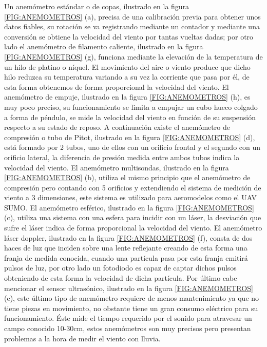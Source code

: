 Un anemómetro estándar o de copas\cite{cupAnemo}, ilustrado en la figura \ref{FIG:ANEMOMETROS} (a), precisa de una calibración previa para obtener unos datos fiables, su rotación se va registrando mediante un contador y mediante una conversión se obtiene la velocidad del viento por tantas vueltas dadas; por otro lado el anemómetro de filamento caliente\cite{hotWireInfoWeb}\cite{hotWireAnem}, ilustrado en la figura \ref{FIG:ANEMOMETROS} (g), funciona mediante la elevación de la temperatura de un hilo de platino o níquel. El movimiento del aire o viento produce que dicho hilo reduzca su temperatura variando a su vez la corriente que pasa por él, de esta forma obtenemos de forma proporcional la velocidad del viento. El anemómetro de empuje\cite{emujeAnem}, ilustrado en la figura \ref{FIG:ANEMOMETROS} (h), es muy poco preciso, su funcionamiento se limita a empujar un cubo hueco colgado a forma de péndulo, se mide la velocidad del viento en función de su suspensión respecto a su estado de reposo. A continuación existe el anemómetro de compresión o tubo de Pitot\cite{Extech}\cite{emujeAnem}, ilustrado en la figura \ref{FIG:ANEMOMETROS} (d), está formado por 2 tubos, uno de ellos con un orificio frontal y el segundo con un orificio lateral, la diferencia de presión medida entre ambos tubos indica la velocidad del viento. El anemómetro multisondas\cite{NASA}\cite{Anemometer2009}, ilustrado en la figura \ref{FIG:ANEMOMETROS} (b), utiliza el mismo principio que el anemómetro de compresión pero contando con 5 orificios y extendiendo el sistema de medición de viento a 3 dimensiones, este sistema es utilizado para aeromodelos como el UAV SUMO. El anemómetro esférico\cite{Holling2007}, ilustrado en la figura \ref{FIG:ANEMOMETROS} (c), utiliza una sistema con una esfera para incidir con un láser, la desviación que sufre el láser indica de forma proporcional la velocidad del viento. El anemómetro láser doppler\cite{Tropea1995}\cite{lasercantilver}\cite{durst1980principles}\cite{albrecht2013laser}, ilustrado en la figura \ref{FIG:ANEMOMETROS} (f), consta de dos haces de luz que inciden sobre una lente reflejante creando de esta forma una franja de medida conocida, cuando una partícula pasa por esta franja emitirá pulsos de luz, por otro lado un fotodiodo es capaz de captar dichos pulsos obteniendo de esta forma la velocidad de dicha partícula. Por último cabe mencionar el sensor ultrasónico\cite{Prudden2016}\cite{Mur2012}, ilustrado en la figura \ref{FIG:ANEMOMETROS} (e), este último tipo de anemómetro requiere de menos mantenimiento ya que no tiene piezas en movimiento, no obstante tiene un gran consumo eléctrico para su funcionamiento. Éste mide el tiempo requerido por el sonido para atravesar un campo conocido 10-30cm, estos anemómetros son muy precisos pero presentan problemas a la hora de medir el viento con lluvia.

